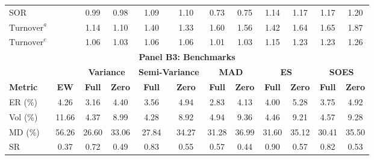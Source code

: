 \begin{table}[bp]
{\begin{tabular}{l*{11}{c}}
    SOR                      &                  & 0.99             & 0.98             & 1.09             & 1.10             & 0.73             & 0.75             & 1.14             & 1.17             & 1.17             & 1.20 \\
    $\text{Turnover}^a$      &                  & 1.14             & 1.10             & 1.40             & 1.33             & 1.60             & 1.56             & 1.42             & 1.64             & 1.65             & 1.87 \\
    $\text{Turnover}^c$      &                  & 1.06             & 1.03             & 1.06             & 1.06             & 1.01             & 1.03             & 1.15             & 1.23             & 1.23             & 1.26 \\
    \midrule
    \multicolumn{12}{c}{\textbf{Panel B3: Benchmarks}} \\
    \midrule
                             &                  & \multicolumn{2}{c}{\textbf{Variance}} & \multicolumn{2}{c}{\textbf{Semi-Variance}} & \multicolumn{2}{c}{\textbf{MAD}} & \multicolumn{2}{c}{\textbf{ES}} & \multicolumn{2}{c}{\textbf{SOES}} \\
    \cmidrule(lr){3-4} \cmidrule(lr){5-6} \cmidrule(lr){7-8} \cmidrule(lr){9-10} \cmidrule(lr){11-12}
    \textbf{Metric}          & \textbf{EW}      & \textbf{Full}    & \textbf{Zero}    & \textbf{Full}    & \textbf{Zero}    & \textbf{Full}    & \textbf{Zero}    & \textbf{Full}    & \textbf{Zero}    & \textbf{Full}    & \textbf{Zero} \\
    \midrule
    ER (\%)                  & 4.26             & 3.16             & 4.40             & 3.56             & 4.94             & 2.83             & 4.13             & 4.00             & 5.28             & 3.75             & 4.92 \\
    Vol (\%)                 & 11.66            & 4.37             & 8.99             & 4.28             & 8.92             & 4.94             & 9.36             & 4.46             & 9.21             & 4.57             & 9.28 \\
    MD (\%)                  & 56.26            & 26.60            & 33.06            & 27.84            & 34.27            & 31.28            & 36.99            & 31.60            & 35.12            & 30.41            & 35.50 \\
    SR                       & 0.37             & 0.72             & 0.49             & 0.83             & 0.55             & 0.57             & 0.44             & 0.90             & 0.57             & 0.82             & 0.53 \\

\end{tabular}}
\end{table}
